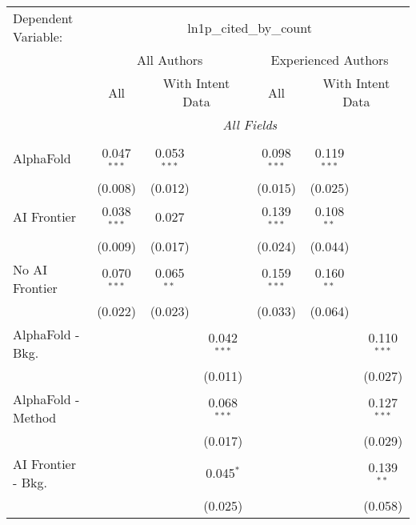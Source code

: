 \begingroup
\centering
\begin{tabular}{lcccccc}
   \tabularnewline \midrule \midrule
   Dependent Variable: & \multicolumn{6}{c}{ln1p\_cited\_by\_count}\\
 & \multicolumn{3}{c}{All Authors} & \multicolumn{3}{c}{Experienced Authors} \\
\cmidrule(lr){2-4} \cmidrule(lr){5-7}
 & \multicolumn{1}{c}{All} & \multicolumn{2}{c}{With Intent Data} & \multicolumn{1}{c}{All} & \multicolumn{2}{c}{With Intent Data} \\
\cmidrule(lr){2-2} \cmidrule(lr){3-4} \cmidrule(lr){5-5} \cmidrule(lr){6-7}
 & \multicolumn{6}{c}{\textit{All Fields}} \\ \\
   AlphaFold               & 0.047$^{***}$ & 0.053$^{***}$ &               & 0.098$^{***}$ & 0.119$^{***}$ &   \\   
                           & (0.008)       & (0.012)       &               & (0.015)       & (0.025)       &   \\   
   AI Frontier             & 0.038$^{***}$ & 0.027         &               & 0.139$^{***}$ & 0.108$^{**}$  &   \\   
                           & (0.009)       & (0.017)       &               & (0.024)       & (0.044)       &   \\   
   No AI Frontier          & 0.070$^{***}$ & 0.065$^{**}$  &               & 0.159$^{***}$ & 0.160$^{**}$  &   \\   
                           & (0.022)       & (0.023)       &               & (0.033)       & (0.064)       &   \\   
   AlphaFold - Bkg.        &               &               & 0.042$^{***}$ &               &               & 0.110$^{***}$\\   
                           &               &               & (0.011)       &               &               & (0.027)\\   
   AlphaFold - Method      &               &               & 0.068$^{***}$ &               &               & 0.127$^{***}$\\   
                           &               &               & (0.017)       &               &               & (0.029)\\   
   AI Frontier - Bkg.      &               &               & 0.045$^{*}$   &               &               & 0.139$^{**}$\\   
                           &               &               & (0.025)       &               &               & (0.058)\\   

\end{tabular}
